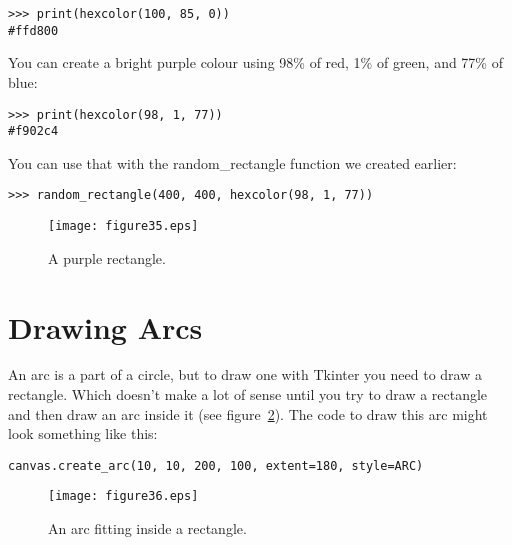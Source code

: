 \begin{listing}
\begin{verbatim}
>>> print(hexcolor(100, 85, 0))
#ffd800
\end{verbatim}
\end{listing}

\noindent
You can create a bright purple colour using 98\% of red, 1\% of green, and 77\% of blue:

\begin{listing}
\begin{verbatim}
>>> print(hexcolor(98, 1, 77))
#f902c4
\end{verbatim}
\end{listing}

\noindent
You can use that with the random\_rectangle function we created earlier:

\begin{listing}
\begin{verbatim}
>>> random_rectangle(400, 400, hexcolor(98, 1, 77))
\end{verbatim}
\end{listing}

\begin{figure}
\begin{center}
\texttt{[image: figure35.eps]}
\end{center}
\caption{A purple rectangle.}\label{fig35}
\end{figure}

\section{Drawing Arcs}

An arc is a part of a circle, but to draw one with Tkinter you need to draw a rectangle. Which doesn't make a lot of sense until you try to draw a rectangle and then draw an arc inside it (see figure~\ref{fig36}). The code to draw this arc might look something like this:

\begin{listing}
\begin{verbatim}
canvas.create_arc(10, 10, 200, 100, extent=180, style=ARC)
\end{verbatim}
\end{listing}

\begin{figure}
\begin{center}
\texttt{[image: figure36.eps]}
\end{center}
\caption{An arc fitting inside a rectangle.}\label{fig36}
\end{figure}

